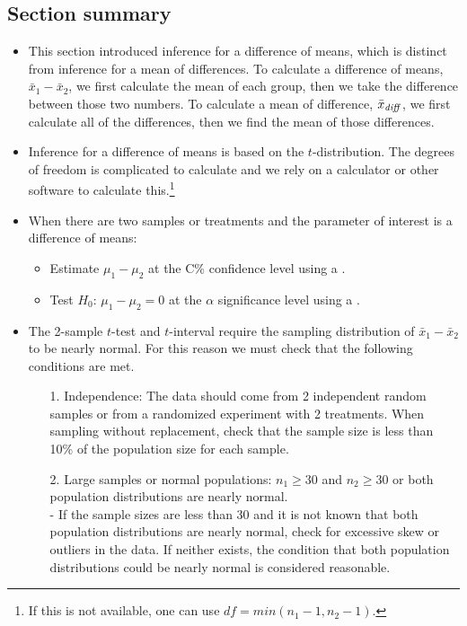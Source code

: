 \subsection*{Section summary}
\begin{itemize} 
\item This section introduced inference for a difference of means, which is distinct from inference for a mean of differences.  To calculate a difference of means, $\bar{x}_1-\bar{x}_2$, we first calculate the mean of each group, then we take the difference between those two numbers.  To calculate a mean of difference, $\bar{x}_{\text{\emph{diff}}}$, we first calculate all of the differences, then we find the mean of those differences.  
\item Inference for a difference of means is based on the $t$-distribution.  The degrees of freedom is complicated to calculate and we rely on a calculator or other software to calculate this.\footnote{If this is not available, one can use $df=min(n_1-1, n_2-1)$.}

\item When there are two samples or treatments and the parameter of interest is a difference of means:  
\begin{itemize}\vspace{-1mm}
\setlength{\itemsep}{0mm}
\item Estimate $\mu_1-\mu_2$ at the C\% confidence level using a .
\item Test $H_0$: $\mu_1-\mu_2=0$ at the $\alpha$ significance level using a .
\end{itemize}

\item The 2-sample $t$-test and $t$-interval require the sampling distribution of $\bar{x}_1-\bar{x}_2$ to be nearly normal.  For this reason we must check that the following conditions are met.
\begin{itemize}
\item[1.] Independence:  The data should come from 2 independent random samples or from a randomized experiment with 2 treatments.  When sampling without replacement, check that the sample size is less than 10\% of the population size for each sample.
\item[2.] Large samples or normal populations:  $n_1\ge 30$ and $n_2\ge 30$ or both population distributions are nearly normal. \\
- If the sample sizes are less than 30 and it is not known that both population distributions are nearly normal, check for excessive skew or outliers in the data.  If neither exists, the condition that both population distributions could be nearly normal is considered reasonable.
\end{itemize}




\end{itemize}
